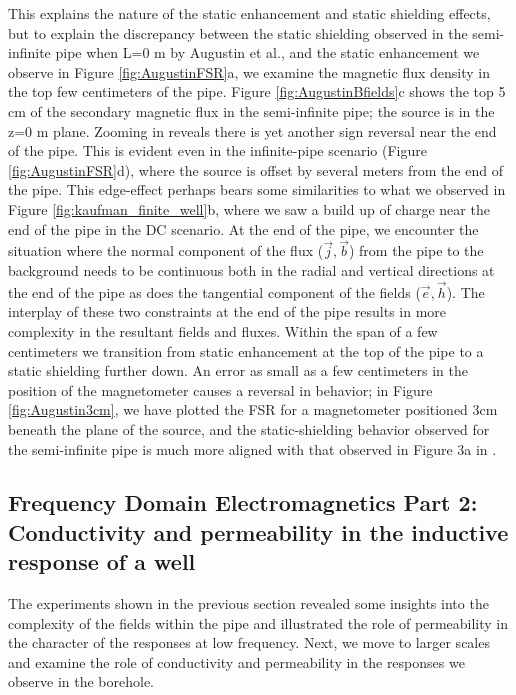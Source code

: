 This explains the nature of the static enhancement and static shielding effects, but to explain the discrepancy between the static shielding observed in the semi-infinite pipe when L=0 m by Augustin et al., and the static enhancement we observe in Figure \ref{fig:AugustinFSR}a, we examine the magnetic flux density in the top few centimeters of the pipe. Figure \ref{fig:AugustinBfields}c shows the top 5 cm of the secondary magnetic flux in the semi-infinite pipe; the source is in the z=0 m plane.  Zooming in reveals there is yet another sign reversal near the end of the pipe. This is evident even in the infinite-pipe scenario (Figure \ref{fig:AugustinFSR}d), where the source is offset by several meters from the end of the pipe. This edge-effect perhaps bears some similarities to what we observed in Figure \ref{fig:kaufman_finite_well}b, where we saw a build up of charge near the end of the pipe in the DC scenario. At the end of the pipe, we encounter the situation where the normal component of the flux ($\vec{j}, \vec{b}$) from the pipe to the background needs to be continuous both in the radial and vertical directions at the end of the pipe as does the tangential component of the fields ($\vec{e}, \vec{h}$). The interplay of these two constraints at the end of the pipe results in more complexity in the resultant fields and fluxes. Within the span of a few centimeters we transition from static enhancement at the top of the pipe to a static shielding further down. An error as small as a few centimeters in the position of the magnetometer causes a reversal in behavior; in Figure \ref{fig:Augustin3cm}, we have plotted the FSR for a magnetometer positioned 3cm beneath the plane of the source, and the static-shielding behavior observed for the semi-infinite pipe is much more aligned with that observed in Figure 3a in \cite{Augustin1989}.








\subsection{Frequency Domain Electromagnetics Part 2: Conductivity and permeability in the inductive response of a well}
\label{sec:FDEM_part2}

The experiments shown in the previous section revealed some insights into the complexity of the fields within the pipe and illustrated the role of permeability in the character of the responses at low frequency. Next, we move to larger scales and examine the role of conductivity and permeability in the responses we observe in the borehole.

